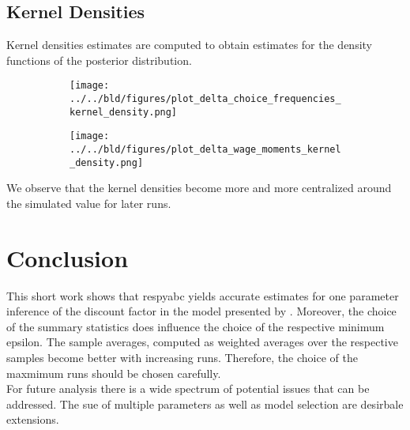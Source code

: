 \documentclass[11pt, a4paper, leqno]{article}
\begin{document}
\subsection{Kernel Densities}
Kernel densities estimates are computed to obtain estimates for the density functions of the posterior distribution.
\label{subsec:kernel_densities}
\begin{figure}[h!]
\begin{subfigure}{.5\textwidth}
  \centering
    \texttt{[image: ../../bld/figures/plot\_delta\_choice\_frequencies\_kernel\_density.png]}
  \label{fig:kernel_density_ci}
\end{subfigure}%
\begin{subfigure}{.5\textwidth}
  \centering
    \texttt{[image: ../../bld/figures/plot\_delta\_wage\_moments\_kernel\_density.png]}
  \label{fig:kernel_density_ci}
\end{subfigure}%

\end{figure}
We observe that the kernel densities become more and more centralized around the simulated value for later runs.
\section{Conclusion}
\label{sec:conclusion}
This short work shows that respyabc yields accurate estimates for one parameter inference of the discount factor in the model presented by \citet{keane1994}. Moreover, the choice of the summary statistics does influence the choice of the respective minimum epsilon. The sample averages, computed as weighted averages over the respective samples become better with increasing runs. Therefore, the choice of the maxmimum runs should be chosen carefully. \\
For future analysis there is a wide spectrum of potential issues that can be addressed. The sue of multiple parameters as well as model selection are desirbale extensions.



\newpage
{}
\printbibliography
{}





\end{document}
